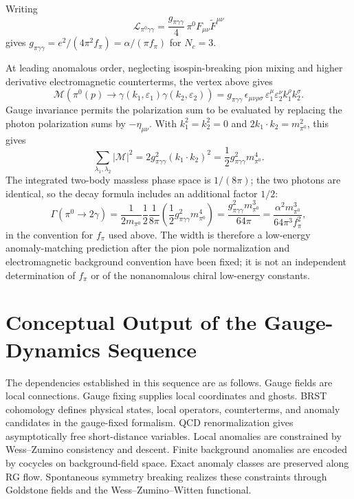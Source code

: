 Writing
\[
  \mathcal L_{\pi^0\gamma\gamma}
  =
  \frac{g_{\pi\gamma\gamma}}4\,
  \pi^0 F_{\mu\nu}\widetilde F^{\mu\nu}
\]
gives \(g_{\pi\gamma\gamma}=e^2/(4\pi^2f_\pi)=\alpha/(\pi f_\pi)\) for
\(N_c=3\).

\begin{controlledapproximation}
\label{ca:neutral-pion-two-photon-width}
At leading anomalous order, neglecting isospin-breaking pion mixing and higher
derivative electromagnetic counterterms, the vertex above gives
\begin{equation}
  \mathcal M(\pi^0(p)\to\gamma(k_1,\varepsilon_1)\gamma(k_2,\varepsilon_2))
  =
  g_{\pi\gamma\gamma}\,
  \epsilon_{\mu\nu\rho\sigma}\,
  \varepsilon_1^\mu\varepsilon_2^\nu k_1^\rho k_2^\sigma .
  \label{eq:pi-zero-two-photon-amplitude}
\end{equation}
Gauge invariance permits the polarization sum to be evaluated by replacing the
photon polarization sums by \(-\eta_{\mu\nu}\).  With
\(k_1^2=k_2^2=0\) and \(2k_1\cdot k_2=m_{\pi^0}^2\), this gives
\begin{equation}
  \sum_{\lambda_1,\lambda_2}|\mathcal M|^2
  =
  2g_{\pi\gamma\gamma}^2(k_1\cdot k_2)^2
  =
  \frac12 g_{\pi\gamma\gamma}^2m_{\pi^0}^4 .
  \label{eq:pi-zero-two-photon-amplitude-square}
\end{equation}
The integrated two-body massless phase space is \(1/(8\pi)\); the two photons
are identical, so the decay formula includes an additional factor \(1/2\):
\begin{equation}
  \Gamma(\pi^0\to2\gamma)
  =
  \frac1{2m_{\pi^0}}\frac12\frac1{8\pi}
  \left(\frac12 g_{\pi\gamma\gamma}^2m_{\pi^0}^4\right)
  =
  \frac{g_{\pi\gamma\gamma}^2m_{\pi^0}^3}{64\pi}
  =
  \frac{\alpha^2m_{\pi^0}^3}{64\pi^3f_\pi^2},
  \label{eq:pi-zero-two-photon-width}
\end{equation}
in the convention for \(f_\pi\) used above.  The width is therefore a
low-energy anomaly-matching prediction after the pion pole normalization and
electromagnetic background convention have been fixed; it is not an
independent determination of \(f_\pi\) or of the nonanomalous chiral
low-energy constants.
\end{controlledapproximation}

\section{Conceptual Output of the Gauge-Dynamics Sequence}

The dependencies established in this sequence are as follows.  Gauge fields are
local connections.  Gauge fixing supplies local coordinates and ghosts.  BRST
cohomology defines physical states, local operators, counterterms, and anomaly
candidates in the gauge-fixed formalism.  QCD renormalization gives
asymptotically free short-distance variables.  Local anomalies are constrained
by Wess--Zumino consistency and descent.  Finite background anomalies are
encoded by cocycles on background-field space.  Exact anomaly classes are
preserved along RG flow.  Spontaneous symmetry breaking realizes these
constraints through Goldstone fields and the Wess--Zumino--Witten functional.
